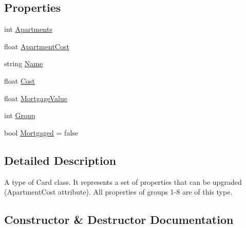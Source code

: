 \subsection*{Properties}
\begin{DoxyCompactItemize}
\item 
int \mbox{\hyperlink{class_monopoly_1_1_main_1_1_property_card_a3622607b45161ab3ec3333592d968f1e}{Apartments}}
\item 
float \mbox{\hyperlink{class_monopoly_1_1_main_1_1_property_card_a136852d07ac06f80a45f329c2a9206b2}{Apartment\+Cost}}
\item 
string \mbox{\hyperlink{class_monopoly_1_1_cards_1_1_card_ac114f0ec54d1b86154e9c596c3980003}{Name}}
\item 
float \mbox{\hyperlink{class_monopoly_1_1_cards_1_1_card_a67df91aa53596b2ce61ef2c3386ddd7c}{Cost}}
\item 
float \mbox{\hyperlink{class_monopoly_1_1_cards_1_1_card_adb2af81dda38706437f368b088c9b1a6}{Mortgage\+Value}}
\item 
int \mbox{\hyperlink{class_monopoly_1_1_cards_1_1_card_a90d55a4790f3d8afeba0203b70fa2086}{Group}}
\item 
bool \mbox{\hyperlink{class_monopoly_1_1_cards_1_1_card_a5569d582a0692b3a37c81dd2320cc367}{Mortgaged}} = false
\end{DoxyCompactItemize}


\subsection{Detailed Description}
A type of Card class. It represents a set of properties that can be upgraded (Apartment\+Cost attribute). All properties of groups 1-\/8 are of this type. 

\subsection{Constructor \& Destructor Documentation}
\mbox{\label{class_monopoly_1_1_main_1_1_property_card_a987490ea399f0eccc5a60653f1fe4a37}} 
